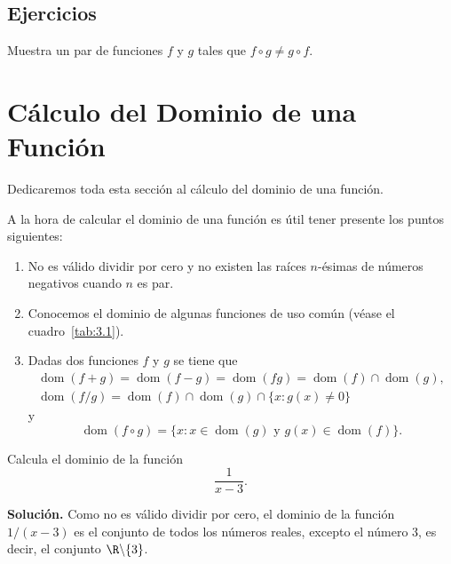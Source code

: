 \documentclass[12pt,a4paper]{book}
\DeclareMathOperator{\dom}{dom}
\begin{document}
    \par{}\subsection*{Ejercicios}

    \begin{ejercicio}\label{ej:87}
        Muestra un par de funciones $f$ y $g$ tales que $f\circ g\neq g\circ f$.
    \end{ejercicio}

    \section{Cálculo del Dominio de una Función}

    Dedicaremos toda esta sección al cálculo del dominio de una función.

    A la hora de calcular el dominio de una función es útil tener presente los
    puntos siguientes:
    \begin{enumerate}[label=\arabic*.,nosep]
        \item No es válido dividir por cero y no existen las raíces $n$-ésimas de números
        negativos cuando $n$ es par.
        \item Conocemos el dominio de algunas funciones de uso común (véase el cuadro~\ref{tab:3.1}).
        \item Dadas dos funciones $f$ y $g$ se tiene que
        \begin{gather*}
            \dom(f+g)=\dom(f-g)=\dom(fg)=\dom(f)\cap\dom(g),\\
            \dom(f/g)=\dom(f)\cap\dom(g)\cap\{x:g(x)\neq 0\}
        \end{gather*}
        y
        \begin{equation*}
            \dom(f\circ g)=\{x:x\in\dom(g)\text{ y }g(x)\in\dom(f)\}.
        \end{equation*}
    \end{enumerate}

    \begin{ejemplo}\label{ejm:10}
        Calcula el dominio de la función
        \begin{equation*}
            \frac{1}{x-3}.
        \end{equation*}

        \textbf{Solución.} Como no es válido dividir por cero, el dominio de la función
        $1/(x-3)$ es el conjunto de todos los números reales, excepto el número $3$, es
        decir, el conjunto $\R\backslash\{3\}$.
    \end{ejemplo}
\end{document}

